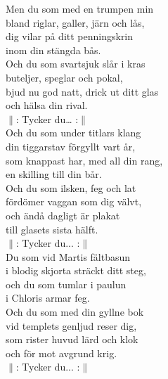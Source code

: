 \documentclass[a6paper, 10pt, twoside]{article}
\begin{document}
\begin{lyrics}
\newpage
\noindent
Men du som med en trumpen min\\
bland riglar, galler, järn och lås,\\
dig vilar på ditt penningskrin\\
inom din stängda bås.\\
Och du som svartsjuk slår i kras\\
buteljer, speglar och pokal,\\
bjud nu god natt, drick ut ditt glas\\
och hälsa din rival.
\vspace{5pt}\\
$\|$: Tycker du… :$\|$
\vspace{5pt}\\
Och du som under titlars klang\\
din tiggarstav förgyllt vart år,\\
som knappast har, med all din rang,\\
en skilling till din bår.\\
Och du som ilsken, feg och lat\\
fördömer vaggan som dig välvt,\\
och ändå dagligt är plakat\\
till glasets sista hälft.
\vspace{5pt}\\
$\|$: Tycker du... :$\|$
\vspace{5pt}\\
Du som vid Martis fältbasun\\
i blodig skjorta sträckt ditt steg,\\
och du som tumlar i paulun\\
i Chloris armar feg.\\
Och du som med din gyllne bok\\
vid templets genljud reser dig,\\
som rister huvud lärd och klok\\
och för mot avgrund krig.
\vspace{5pt}\\
$\|$: Tycker du... :$\|$


\end{lyrics}
\end{document}
